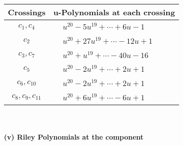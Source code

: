 \documentclass[1p]{elsarticle_modified}
\theoremstyle{definition}
\begin{document}
\begin{tabular}{m{50pt}|m{274pt}}
Crossings & \hspace{64pt}u-Polynomials at each crossing \\
\hline $$\begin{aligned}c_{1},c_{4}\end{aligned}$$&$\begin{aligned}
&u^{20}-5 u^{19}+\cdots+6 u-1
\end{aligned}$\\
\hline $$\begin{aligned}c_{2}\end{aligned}$$&$\begin{aligned}
&u^{20}+27 u^{19}+\cdots-12 u+1
\end{aligned}$\\
\hline $$\begin{aligned}c_{3},c_{7}\end{aligned}$$&$\begin{aligned}
&u^{20}+u^{19}+\cdots-40 u-16
\end{aligned}$\\
\hline $$\begin{aligned}c_{5}\end{aligned}$$&$\begin{aligned}
&u^{20}-2 u^{19}+\cdots+2 u+1
\end{aligned}$\\
\hline $$\begin{aligned}c_{6},c_{10}\end{aligned}$$&$\begin{aligned}
&u^{20}-2 u^{19}+\cdots+2 u+1
\end{aligned}$\\
\hline $$\begin{aligned}c_{8},c_{9},c_{11}\end{aligned}$$&$\begin{aligned}
&u^{20}+6 u^{19}+\cdots-6 u+1
\end{aligned}$\\
\hline
\end{tabular}\\~\\
\newpage\renewcommand{\arraystretch}{1}
\flushleft \textbf{(v) Riley Polynomials at the component}\newline \\
\end{document}

